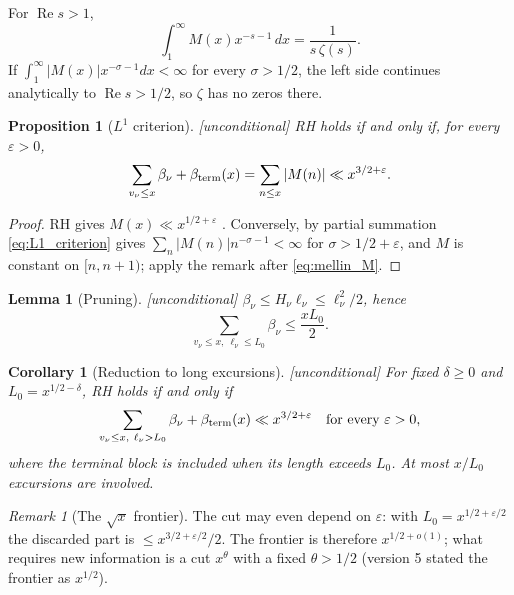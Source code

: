 \documentclass[11pt]{amsart}
\numberwithin{equation}{section}
\theoremstyle{plain}
\newtheorem{proposition}[theorem]{Proposition}
\newtheorem{lemma}[theorem]{Lemma}
\newtheorem{corollary}[theorem]{Corollary}
\theoremstyle{definition}
\theoremstyle{remark}
\newtheorem{remark}[theorem]{Remark}
\newcommand{\eps}{\varepsilon}
\begin{document}
For $\operatorname{Re}s>1$,
\begin{equation}
\label{eq:mellin_M}
  \int_1^\infty M(x)x^{-s-1}\,dx=\frac{1}{s\,\zeta(s)} .
\end{equation}
If $\int_1^\infty|M(x)|x^{-\sigma-1}dx<\infty$ for every $\sigma>1/2$, the
left side continues analytically to $\operatorname{Re}s>1/2$, so $\zeta$ has
no zeros there.

\begin{proposition}[$L^1$ criterion]
\label{prop:L1}
\emph{[unconditional]} RH holds if and only if, for every $\eps>0$,
\begin{equation}
\label{eq:L1_criterion}
  \sum_{v_\nu\le x}\beta_\nu+\beta_{\rm term}(x)=\sum_{n\le x}|M(n)|
  \ll x^{3/2+\eps}.
\end{equation}
\end{proposition}

\begin{proof}
RH gives $M(x)\ll x^{1/2+\eps}$ \cite[\S14.25]{Titchmarsh1986}. Conversely,
by partial summation \eqref{eq:L1_criterion} gives
$\sum_n|M(n)|n^{-\sigma-1}<\infty$ for $\sigma>1/2+\eps$, and $M$ is
constant on $[n,n+1)$; apply the remark after \eqref{eq:mellin_M}.
\end{proof}

\begin{lemma}[Pruning]
\label{lem:pruning}
\emph{[unconditional]} $\beta_\nu\le H_\nu\ell_\nu\le\ell_\nu^2/2$, hence
\begin{equation}
\label{eq:pruning}
  \sum_{v_\nu\le x,\ \ell_\nu\le L_0}\beta_\nu\le\frac{xL_0}{2}.
\end{equation}
\end{lemma}

\begin{corollary}[Reduction to long excursions]
\label{cor:long}
\emph{[unconditional]} For fixed $\delta\ge0$ and $L_0=x^{1/2-\delta}$, RH
holds if and only if
\begin{equation}
\label{eq:long_reduction}
  \sum_{v_\nu\le x,\ \ell_\nu>L_0}\beta_\nu+\beta_{\rm term}(x)\ll x^{3/2+\eps}
  \quad\text{for every }\eps>0,
\end{equation}
where the terminal block is included when its length exceeds $L_0$. At most
$x/L_0$ excursions are involved.
\end{corollary}

\begin{remark}[The $\sqrt{x}$ frontier]
\label{rem:sqrt_frontier}
The cut may even depend on $\eps$: with $L_0=x^{1/2+\eps/2}$ the discarded
part is $\le x^{3/2+\eps/2}/2$. The frontier is therefore $x^{1/2+o(1)}$;
what requires new information is a cut $x^{\theta}$ with a fixed
$\theta>1/2$ (version 5 stated the frontier as $x^{1/2}$).
\end{remark}
\end{document}
